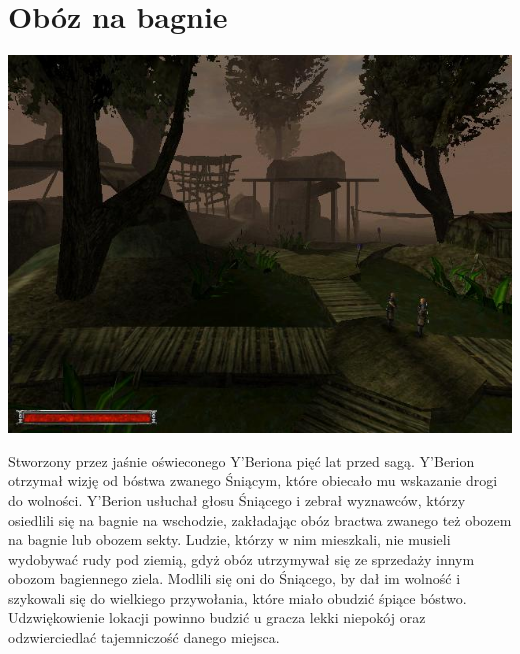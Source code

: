 \documentclass[11pt,polish, openany]{book}
\begin{document}
\section{Obóz na bagnie}
\begin{center}
 \includegraphics[scale=0.5]{nabagnie.jpg}
\end{center}
Stworzony przez jaśnie oświeconego Y'Beriona pięć lat przed sagą. Y'Berion otrzymał wizję od bóstwa zwanego Śniącym, które obiecało mu wskazanie drogi do wolności. Y'Berion usłuchał głosu Śniącego i zebrał wyznawców, którzy osiedlili się na bagnie na wschodzie, zakładając obóz bractwa zwanego też obozem na bagnie lub obozem sekty. Ludzie, którzy w nim mieszkali, nie musieli wydobywać rudy pod ziemią, gdyż obóz utrzymywał się ze sprzedaży innym obozom bagiennego ziela. Modlili się oni do Śniącego, by dał im wolność i szykowali się do wielkiego przywołania, które miało obudzić śpiące bóstwo.
Udzwiękowienie lokacji powinno budzić u gracza lekki niepokój oraz odzwierciedlać tajemniczość danego miejsca.
\end{document}
